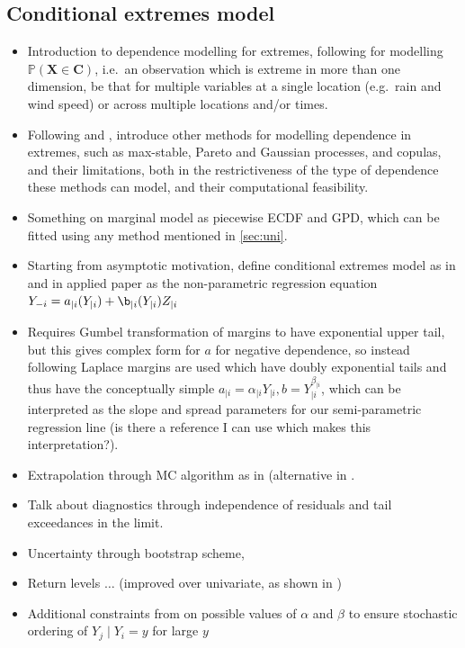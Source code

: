 \documentclass{article}
\numberwithin{equation}{section}
\begin{document}
\subsection{Conditional extremes model}
\begin{itemize}
  \item Introduction to dependence modelling for extremes, following \cite{Heffernan2004} for modelling $\mathbb{P}(\bm{X} \in \bm{C})$, i.e.\ an observation which is extreme in more than one dimension, be that for multiple variables at a single location (e.g.\ rain and wind speed) or across multiple locations and/or times. 
  \item Following \cite{Tawn2018} and \cite{Heffernan2004}, introduce other methods for modelling dependence in extremes, such as max-stable, Pareto and Gaussian processes, and copulas, and their limitations, both in the restrictiveness of the type of dependence these methods can model, and their computational feasibility.
  \item Something on marginal model as piecewise ECDF and GPD, which can be fitted using any method mentioned in \ref{sec:uni}. 
  \item Starting from asymptotic motivation, define conditional extremes model as in \cite{Heffernan2004} and in applied paper as the non-parametric regression equation $Y_{-i} = a_{\mid i}(Y_{\mid i}) + \b_{\mid i}(Y_{\mid i}) Z_{\mid i}$
  \item Requires Gumbel transformation of margins to have exponential upper tail, but this gives complex form for $a$ for negative dependence, so instead following \cite{Keef2013} Laplace margins are used which have doubly exponential tails and thus have the conceptually simple $a_{\mid i} = \alpha_{\mid i}Y_{\mid i} , b = Y_{\mid i}^{\beta_{\mid i}}$, which can be interpreted as the slope and spread parameters for our semi-parametric regression line (is there a reference I can use which makes this interpretation?). 
  \item Extrapolation through MC algorithm as in \cite{Heffernan2004} (alternative in \cite{Keef2013}.
  \item Talk about diagnostics through independence of residuals and tail exceedances in the limit. 
  \item Uncertainty through bootstrap scheme,
  \item Return levels $\ldots$ (improved over univariate, as shown in \cite{Zhang2024})
  \item Additional constraints from \cite{Keef2013} on possible values of $\alpha$ and $\beta$ to ensure stochastic ordering of $Y_j \mid Y_i = y$ for large $y$ 
\end{itemize}
\end{document}
